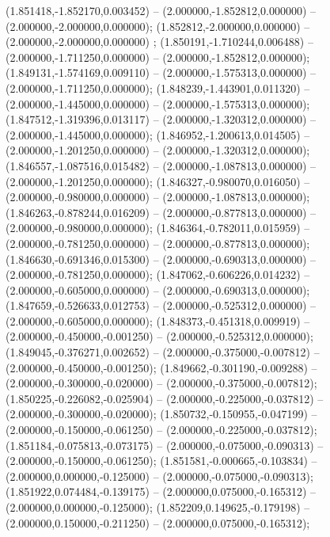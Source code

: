  (1.851418,-1.852170,0.003452) -- (2.000000,-1.852812,0.000000) -- (2.000000,-2.000000,0.000000);
 (1.852812,-2.000000,0.000000) -- (2.000000,-2.000000,0.000000) ;
 (1.850191,-1.710244,0.006488) -- (2.000000,-1.711250,0.000000) -- (2.000000,-1.852812,0.000000);
 (1.849131,-1.574169,0.009110) -- (2.000000,-1.575313,0.000000) -- (2.000000,-1.711250,0.000000);
 (1.848239,-1.443901,0.011320) -- (2.000000,-1.445000,0.000000) -- (2.000000,-1.575313,0.000000);
 (1.847512,-1.319396,0.013117) -- (2.000000,-1.320312,0.000000) -- (2.000000,-1.445000,0.000000);
 (1.846952,-1.200613,0.014505) -- (2.000000,-1.201250,0.000000) -- (2.000000,-1.320312,0.000000);
 (1.846557,-1.087516,0.015482) -- (2.000000,-1.087813,0.000000) -- (2.000000,-1.201250,0.000000);
 (1.846327,-0.980070,0.016050) -- (2.000000,-0.980000,0.000000) -- (2.000000,-1.087813,0.000000);
 (1.846263,-0.878244,0.016209) -- (2.000000,-0.877813,0.000000) -- (2.000000,-0.980000,0.000000);
 (1.846364,-0.782011,0.015959) -- (2.000000,-0.781250,0.000000) -- (2.000000,-0.877813,0.000000);
 (1.846630,-0.691346,0.015300) -- (2.000000,-0.690313,0.000000) -- (2.000000,-0.781250,0.000000);
 (1.847062,-0.606226,0.014232) -- (2.000000,-0.605000,0.000000) -- (2.000000,-0.690313,0.000000);
 (1.847659,-0.526633,0.012753) -- (2.000000,-0.525312,0.000000) -- (2.000000,-0.605000,0.000000);
 (1.848373,-0.451318,0.009919) -- (2.000000,-0.450000,-0.001250) -- (2.000000,-0.525312,0.000000);
 (1.849045,-0.376271,0.002652) -- (2.000000,-0.375000,-0.007812) -- (2.000000,-0.450000,-0.001250);
 (1.849662,-0.301190,-0.009288) -- (2.000000,-0.300000,-0.020000) -- (2.000000,-0.375000,-0.007812);
 (1.850225,-0.226082,-0.025904) -- (2.000000,-0.225000,-0.037812) -- (2.000000,-0.300000,-0.020000);
 (1.850732,-0.150955,-0.047199) -- (2.000000,-0.150000,-0.061250) -- (2.000000,-0.225000,-0.037812);
 (1.851184,-0.075813,-0.073175) -- (2.000000,-0.075000,-0.090313) -- (2.000000,-0.150000,-0.061250);
 (1.851581,-0.000665,-0.103834) -- (2.000000,0.000000,-0.125000) -- (2.000000,-0.075000,-0.090313);
 (1.851922,0.074484,-0.139175) -- (2.000000,0.075000,-0.165312) -- (2.000000,0.000000,-0.125000);
 (1.852209,0.149625,-0.179198) -- (2.000000,0.150000,-0.211250) -- (2.000000,0.075000,-0.165312);
